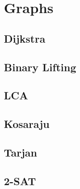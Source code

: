 \section{Graphs}

\subsection{Dijkstra}



\subsection{Binary Lifting}



\subsection{LCA}



\subsection{Kosaraju}



\subsection{Tarjan}



\subsection{2-SAT}

